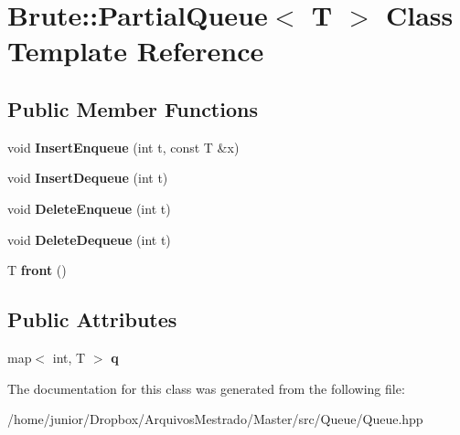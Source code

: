 \hypertarget{classBrute_1_1PartialQueue}{}\section{Brute\+:\+:Partial\+Queue$<$ T $>$ Class Template Reference}
\label{classBrute_1_1PartialQueue}
\subsection*{Public Member Functions}
\begin{DoxyCompactItemize}
\item 
\mbox{\label{classBrute_1_1PartialQueue_adaa00384721f3801ede6ecc7a7203100}} 
void {\bfseries Insert\+Enqueue} (int t, const T \&x)
\item 
\mbox{\label{classBrute_1_1PartialQueue_a9c5a4ffa1216d759f6339d2f56983618}} 
void {\bfseries Insert\+Dequeue} (int t)
\item 
\mbox{\label{classBrute_1_1PartialQueue_a4541c69cc2624fb28ffadd1f1cfc84e9}} 
void {\bfseries Delete\+Enqueue} (int t)
\item 
\mbox{\label{classBrute_1_1PartialQueue_ab3dbd1645e133e8e01297ce0265dfac8}} 
void {\bfseries Delete\+Dequeue} (int t)
\item 
\mbox{\label{classBrute_1_1PartialQueue_ab90169266f018db61fa665d8cfba2e85}} 
T {\bfseries front} ()
\end{DoxyCompactItemize}
\subsection*{Public Attributes}
\begin{DoxyCompactItemize}
\item 
\mbox{\label{classBrute_1_1PartialQueue_a49bb4bf3e1669136e3fdefdf37df3d8e}} 
map$<$ int, T $>$ {\bfseries q}
\end{DoxyCompactItemize}


The documentation for this class was generated from the following file\+:\begin{DoxyCompactItemize}
\item 
/home/junior/\+Dropbox/\+Arquivos\+Mestrado/\+Master/src/\+Queue/Queue.\+hpp\end{DoxyCompactItemize}
